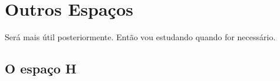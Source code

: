 \documentclass[a4paper, 11pt]{book}
\newcommand{\rn}{{\mathbb{R}^n}}
\begin{document}










\section{Outros Espaços}

Será mais útil posteriormente. Então vou estudando quando for necessário.

\subsection{O espaço H}
\end{document}
